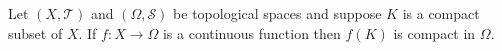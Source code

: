 Let $(X, \mathcal{T})$ and $(\Omega, \mathcal{S})$ be topological spaces and suppose $K$ is a compact subset of $X$. If $f: X \to \Omega$ is a continuous function then $f(K)$ is compact in $\Omega$.
